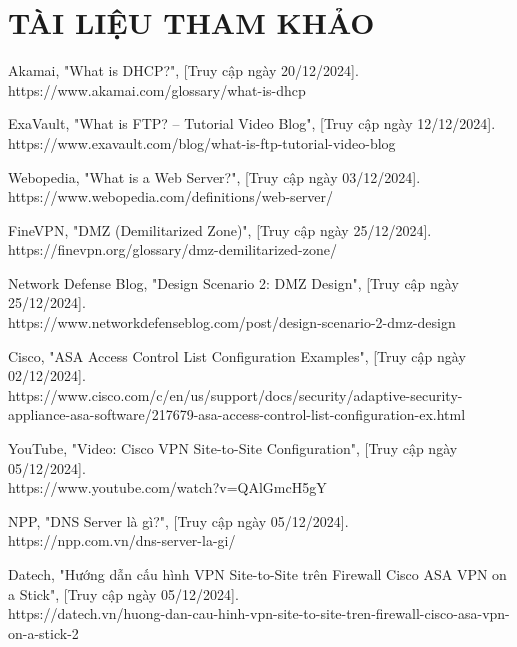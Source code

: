 \documentclass[13pt]{article}
\begin{document}
\newpage
{}
\section*{TÀI LIỆU THAM KHẢO}
\renewcommand{\refname}{}

\begin{thebibliography}{99}

Akamai, "What is DHCP?", [Truy cập ngày 20/12/2024].\\
https://www.akamai.com/glossary/what-is-dhcp

ExaVault, "What is FTP? – Tutorial Video Blog", [Truy cập ngày 12/12/2024].\\
https://www.exavault.com/blog/what-is-ftp-tutorial-video-blog

Webopedia, "What is a Web Server?", [Truy cập ngày 03/12/2024].  \\
https://www.webopedia.com/definitions/web-server/

FineVPN, "DMZ (Demilitarized Zone)", [Truy cập ngày 25/12/2024].  \\
https://finevpn.org/glossary/dmz-demilitarized-zone/

Network Defense Blog, "Design Scenario 2: DMZ Design", [Truy cập ngày 25/12/2024].  \\
https://www.networkdefenseblog.com/post/design-scenario-2-dmz-design

Cisco, "ASA Access Control List Configuration Examples", [Truy cập ngày 02/12/2024].  \\
https://www.cisco.com/c/en/us/support/docs/security/adaptive-security-appliance-asa-software/217679-asa-access-control-list-configuration-ex.html

YouTube, "Video: Cisco VPN Site-to-Site Configuration", [Truy cập ngày 05/12/2024].  \\
https://www.youtube.com/watch?v=QAlGmcH5gY

NPP, "DNS Server là gì?", [Truy cập ngày 05/12/2024].\\
https://npp.com.vn/dns-server-la-gi/

Datech, "Hướng dẫn cấu hình VPN Site-to-Site trên Firewall Cisco ASA VPN on a Stick", [Truy cập ngày 05/12/2024].  \\
https://datech.vn/huong-dan-cau-hinh-vpn-site-to-site-tren-firewall-cisco-asa-vpn-on-a-stick-2
\end{thebibliography}
\end{document}
